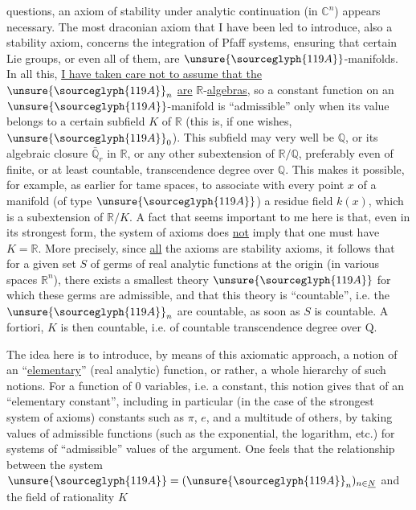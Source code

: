 
questions, an axiom of stability under analytic continuation
(in $\mathbb{C}^{n}$) appears necessary. The most draconian axiom that
I have been led to introduce, also a stability axiom,
concerns the integration of Pfaff systems, ensuring that certain
Lie groups, or even all of them, are $\unsure{\sourceglyph{119A}}$-manifolds. In all
this, \uline{I have taken care not to assume that the} $\unsure{\sourceglyph{119A}}_{n}$ \uline{are}
\uline{$\mathbb{R}$}-\uline{algebras}, so a constant function on an $\unsure{\sourceglyph{119A}}$-manifold is
``admissible'' only when its value belongs to a certain subfield
$K$ of $\mathbb{R}$ (this is, if one wishes, $\unsure{\sourceglyph{119A}}_{0}$). This subfield may very well
be $\mathbb{Q}$, or its algebraic closure $\bar{\mathbb{Q}}_{r}$ in $\mathbb{R}$, or any other
subextension of $\mathbb{R}/\mathbb{Q}$, preferably even of finite,
or at least countable, transcendence degree over $\mathbb{Q}$. This makes it possible,
for example, as earlier for tame spaces, to associate
with every point $x$ of a manifold (of type $\unsure{\sourceglyph{119A}}$) a residue
field $k(x)$, which is a subextension of $\mathbb{R}/K$. A fact that
seems important to me here is that, even in its strongest form,
the system of axioms does \uline{not} imply that one must have $K = \mathbb{R}$. More
precisely, since \uline{all} the axioms are stability
axioms, it follows that for a given set $S$ of germs
of real analytic functions at the origin (in various spaces
$\mathbb{R}^{n}$), there exists a smallest theory $\unsure{\sourceglyph{119A}}$ for which these germs
are admissible, and that this theory is ``countable'', i.e. the $\unsure{\sourceglyph{119A}}_{n}$
are countable, as soon as $S$ is countable. A fortiori, $K$ is then
countable, i.e. of countable transcendence degree over $\mathrm{Q}$.

The idea here is to introduce, by means of this
axiomatic approach, a notion of an ``\uline{elementary}'' (real analytic) function,
or rather, a whole hierarchy of such notions. For a function
of 0 variables, i.e. a constant, this notion gives that
of an ``elementary constant'', including in particular (in the case of
the strongest system of axioms) constants such as $\pi$, $e$, and
a multitude of others, by taking values of admissible functions
(such as the exponential, the logarithm, etc.) for systems
of ``admissible'' values of the argument. One feels that the relationship
between the system $\unsure{\sourceglyph{119A}} = (\unsure{\sourceglyph{119A}}_{n})_{n\in\underline{N}}$ and the field of rationality $K$

